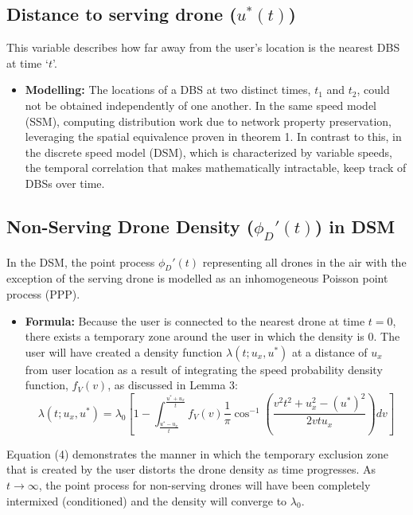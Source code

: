 \documentclass[12pt,a4paper]{article}
\begin{document}
   \subsection*{Distance to serving drone ($u^*(t)$)} %
This variable describes how far away from the user’s location is the nearest DBS at time ‘$t$’.    %
\begin{itemize}
    \item \textbf{Modelling:} The locations of a DBS at two distinct times, $t_1$ and $t_2$, could not be obtained independently of one another.    %
    In the same speed model (SSM), computing distribution work due to network property preservation, leveraging the spatial equivalence proven in theorem 1. In contrast to this, in the discrete speed model (DSM), which is characterized by variable speeds, the temporal correlation that makes mathematically intractable, keep track of DBSs over time.    %
\end{itemize}

   \subsection*{Non-Serving Drone Density ($\phi_D'(t)$) in DSM} %
In the DSM, the point process $\phi_D'(t)$ representing all drones in the air with the exception of the serving drone is modelled as an inhomogeneous Poisson point process (PPP).    %
\begin{itemize}
       \item \textbf{Formula:} Because the user is connected to the nearest drone at time $t=0$, there exists a temporary zone around the user in which the density is 0. The user will have created a density function $\lambda(t; u_x, u^*)$ at a distance of $u_x$ from user location as a result of integrating the speed probability density function, $f_V(v)$, as discussed in Lemma 3: %
       $$\lambda(t; u_x, u^*) = \lambda_0 \left[ 1 - \int_{\frac{u^* - u_x}{t}}^{\frac{u^* + u_x}{t}} f_V(v) \frac{1}{\pi} \cos^{-1}\left( \frac{v^2 t^2 + u_x^2 - (u^*)^2}{2vtu_x} \right) dv \right]$$ %
\end{itemize}
Equation (4) demonstrates the manner in which the temporary exclusion zone that is created by the user distorts the drone density as time progresses.    %
As $t \rightarrow \infty$, the point process for non-serving drones will have been completely intermixed (conditioned) and the density will converge to $\lambda_0$.    %
\end{document}
